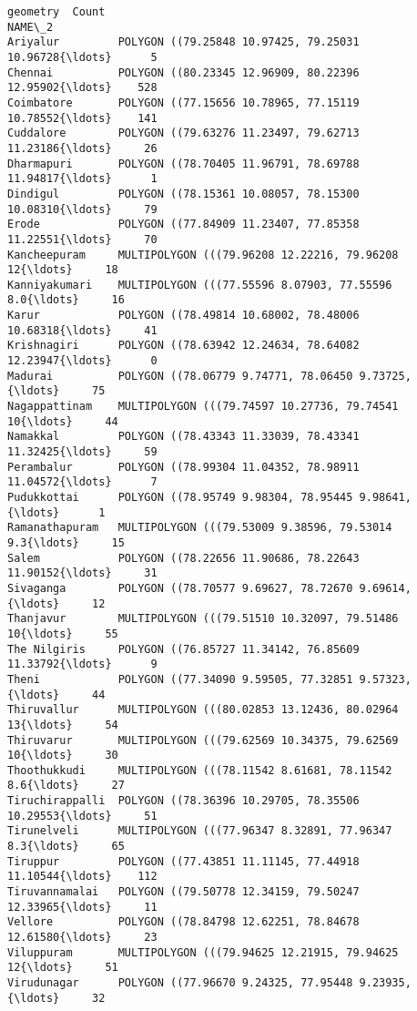 \documentclass[11pt]{article}
\newcommand{\prompt}[4]{
        \llap{{\color{#2}[#3]: #4}}\vspace{-1.25em}
    }
\begin{document}
            \begin{tcolorbox}[breakable, boxrule=.5pt, size=fbox, pad at break*=1mm, opacityfill=0]
\prompt{Out}{outcolor}{112}{\hspace{3.5pt}}
\begin{Verbatim}[commandchars=\\\{\}]
                                                          geometry  Count
NAME\_2
Ariyalur         POLYGON ((79.25848 10.97425, 79.25031 10.96728{\ldots}      5
Chennai          POLYGON ((80.23345 12.96909, 80.22396 12.95902{\ldots}    528
Coimbatore       POLYGON ((77.15656 10.78965, 77.15119 10.78552{\ldots}    141
Cuddalore        POLYGON ((79.63276 11.23497, 79.62713 11.23186{\ldots}     26
Dharmapuri       POLYGON ((78.70405 11.96791, 78.69788 11.94817{\ldots}      1
Dindigul         POLYGON ((78.15361 10.08057, 78.15300 10.08310{\ldots}     79
Erode            POLYGON ((77.84909 11.23407, 77.85358 11.22551{\ldots}     70
Kancheepuram     MULTIPOLYGON (((79.96208 12.22216, 79.96208 12{\ldots}     18
Kanniyakumari    MULTIPOLYGON (((77.55596 8.07903, 77.55596 8.0{\ldots}     16
Karur            POLYGON ((78.49814 10.68002, 78.48006 10.68318{\ldots}     41
Krishnagiri      POLYGON ((78.63942 12.24634, 78.64082 12.23947{\ldots}      0
Madurai          POLYGON ((78.06779 9.74771, 78.06450 9.73725, {\ldots}     75
Nagappattinam    MULTIPOLYGON (((79.74597 10.27736, 79.74541 10{\ldots}     44
Namakkal         POLYGON ((78.43343 11.33039, 78.43341 11.32425{\ldots}     59
Perambalur       POLYGON ((78.99304 11.04352, 78.98911 11.04572{\ldots}      7
Pudukkottai      POLYGON ((78.95749 9.98304, 78.95445 9.98641, {\ldots}      1
Ramanathapuram   MULTIPOLYGON (((79.53009 9.38596, 79.53014 9.3{\ldots}     15
Salem            POLYGON ((78.22656 11.90686, 78.22643 11.90152{\ldots}     31
Sivaganga        POLYGON ((78.70577 9.69627, 78.72670 9.69614, {\ldots}     12
Thanjavur        MULTIPOLYGON (((79.51510 10.32097, 79.51486 10{\ldots}     55
The Nilgiris     POLYGON ((76.85727 11.34142, 76.85609 11.33792{\ldots}      9
Theni            POLYGON ((77.34090 9.59505, 77.32851 9.57323, {\ldots}     44
Thiruvallur      MULTIPOLYGON (((80.02853 13.12436, 80.02964 13{\ldots}     54
Thiruvarur       MULTIPOLYGON (((79.62569 10.34375, 79.62569 10{\ldots}     30
Thoothukkudi     MULTIPOLYGON (((78.11542 8.61681, 78.11542 8.6{\ldots}     27
Tiruchirappalli  POLYGON ((78.36396 10.29705, 78.35506 10.29553{\ldots}     51
Tirunelveli      MULTIPOLYGON (((77.96347 8.32891, 77.96347 8.3{\ldots}     65
Tiruppur         POLYGON ((77.43851 11.11145, 77.44918 11.10544{\ldots}    112
Tiruvannamalai   POLYGON ((79.50778 12.34159, 79.50247 12.33965{\ldots}     11
Vellore          POLYGON ((78.84798 12.62251, 78.84678 12.61580{\ldots}     23
Viluppuram       MULTIPOLYGON (((79.94625 12.21915, 79.94625 12{\ldots}     51
Virudunagar      POLYGON ((77.96670 9.24325, 77.95448 9.23935, {\ldots}     32
\end{Verbatim}
\end{tcolorbox}
        
\end{document}
